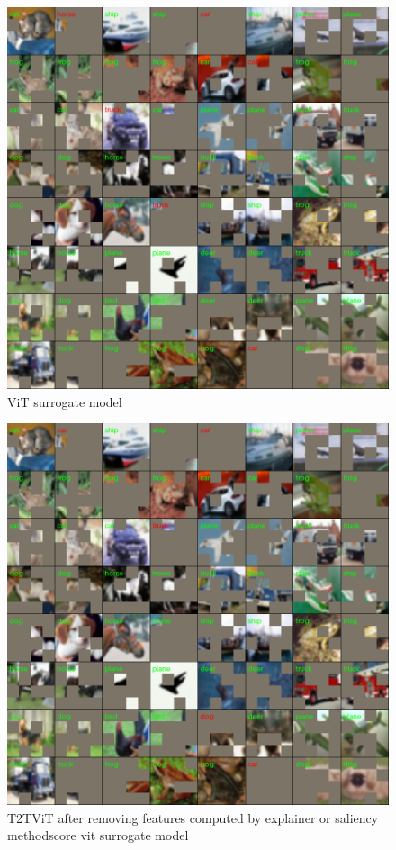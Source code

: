 \documentclass[en]{pracamgr}
\begin{document}
\begin{figure}[H]
\centering
\includegraphics[scale=0.5]{./images/vit_surrogate_masks.png}
\caption{ViT surrogate model}
\label{vit_surrogate_masks}
\end{figure}


\begin{figure}[H]
\centering
\includegraphics[scale=0.5]{./images/t2t_vit_surrogate_masks.png}
\caption{T2T\textunderscore ViT after removing features computed by explainer or saliency methodscore vit surrogate model}
\label{t2t_vit_surrogate_masks}
\end{figure}
\end{document}
